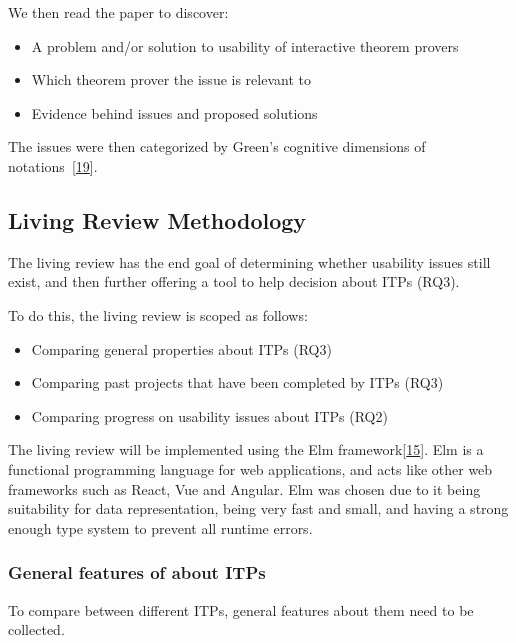 \documentclass[
]{article}
\providecommand{\tightlist}{%
  \setlength{\itemsep}{0pt}\setlength{\parskip}{0pt}}
\begin{document}
We then read the paper to discover:

\begin{itemize}
\tightlist
\item
  A problem and/or solution to usability of interactive theorem provers
\item
  Which theorem prover the issue is relevant to
\item
  Evidence behind issues and proposed solutions
\end{itemize}

The issues were then categorized by Green's cognitive dimensions of
notations~{[}\protect\hyperlink{ref-green_usability_1996}{19}{]}.

\hypertarget{living-review-methodology}{%
\subsection{Living Review Methodology}\label{living-review-methodology}}

The living review has the end goal of determining whether usability
issues still exist, and then further offering a tool to help decision
about ITPs (RQ3).

To do this, the living review is scoped as follows:

\begin{itemize}
\tightlist
\item
  Comparing general properties about ITPs (RQ3)
\item
  Comparing past projects that have been completed by ITPs (RQ3)
\item
  Comparing progress on usability issues about ITPs (RQ2)
\end{itemize}

The living review will be implemented using the Elm
framework{[}\protect\hyperlink{ref-elm_lang_book}{15}{]}. Elm is a
functional programming language for web applications, and acts like
other web frameworks such as React, Vue and Angular. Elm was chosen due
to it being suitability for data representation, being very fast and
small, and having a strong enough type system to prevent all runtime
errors.

\hypertarget{general-features-of-about-itps}{%
\subsubsection{General features of about
ITPs}\label{general-features-of-about-itps}}

To compare between different ITPs, general features about them need to
be collected.
\end{document}
